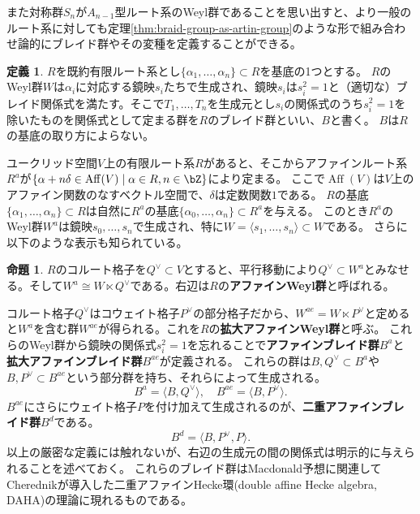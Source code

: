 \documentclass[a4j,uplatex,dvipdfmx]{jsarticle}
\numberwithin{equation}{section}
\numberwithin{figure}{section}
\theoremstyle{definition}
\newtheorem{proposition}[theorem]{命題}
\newtheorem{definition}[theorem]{定義}
\DeclareMathOperator{\Aff}{Aff}
\begin{document}
また対称群$S_n$が$A_{n-1}$型ルート系のWeyl群であることを思い出すと、より一般のルート系に対しても定理\ref{thm:braid-group-as-artin-group}のような形で組み合わせ論的にブレイド群やその変種を定義することができる。
\begin{definition}
    $R$を既約有限ルート系とし$\{\alpha_1, \dots, \alpha_n\} \subset R$を基底の1つとする。
    $R$のWeyl群$W$は$\alpha_i$に対応する鏡映$s_i$たちで生成され、鏡映$s_i$は$s_i^2=1$と（適切な）ブレイド関係式を満たす。そこで$T_1, \dots, T_n$を生成元とし$s_i$の関係式のうち$s_i^2=1$を除いたものを関係式として定まる群を$R$のブレイド群といい、$B$と書く。
    $B$は$R$の基底の取り方によらない。
\end{definition}
ユークリッド空間$V$上の有限ルート系$R$があると、そこからアファインルート系$R^{a}$が$\{\alpha + n \delta \in \Aff(V) \mid \alpha \in R, n \in \bZ\}$により定まる。
ここで$\Aff(V)$は$V$上のアファイン関数のなすベクトル空間で、$\delta$は定数関数$1$である。
$R$の基底$\{\alpha_1, \dots, \alpha_n\} \subset R$は自然に$R^{a}$の基底$\{\alpha_0, \dots, \alpha_n\} \subset R^{a}$を与える。
このとき$R^{a}$のWeyl群$W^{a}$は鏡映$s_0, \dots, s_n$で生成され、特に$W = \langle s_1, \dots, s_n\rangle \subset W$である。
さらに以下のような表示も知られている。
\begin{proposition}
    $R$のコルート格子を$Q^\vee \subset V$とすると、平行移動により$Q^\vee \subset W^{a}$とみなせる。そして$W^{a} \cong W \ltimes Q^\vee$である。右辺は$R$の\textbf{アファインWeyl群}と呼ばれる。
\end{proposition}
コルート格子$Q^\vee$はコウェイト格子$P^\vee$の部分格子だから、$W^{ae} = W \ltimes P^\vee$と定めると$W^{a}$を含む群$W^{ae}$が得られる。これを$R$の\textbf{拡大アファインWeyl群}と呼ぶ。
これらのWeyl群から鏡映の関係式$s_i^2 = 1$を忘れることで\textbf{アファインブレイド群}$B^{a}$と\textbf{拡大アファインブレイド群}$B^{ae}$が定義される。
これらの群は$B, Q^\vee \subset B^{a}$や$B, P^\vee \subset B^{ae}$という部分群を持ち、それらによって生成される。
\begin{equation}
    B^{a} = \langle B, Q^\vee \rangle, \quad B^{ae} = \langle B, P^\vee \rangle.
\end{equation}
$B^{ae}$にさらにウェイト格子$P$を付け加えて生成されるのが、\textbf{二重アファインブレイド群}$B^{d}$である。
\begin{equation}
    B^{d} = \langle B, P^\vee, P\rangle.
\end{equation}
以上の厳密な定義には触れないが、右辺の生成元の間の関係式は明示的に与えられることを述べておく。
これらのブレイド群はMacdonald予想に関連してCherednikが導入した二重アファインHecke環(double affine Hecke algebra, DAHA)の理論に現れるものである。
\end{document}
